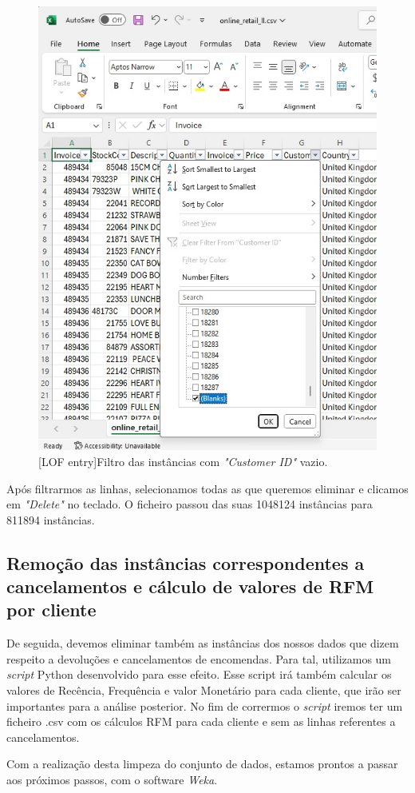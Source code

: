 \documentclass{easychair}
\begin{document}
\begin{figure}[H]
    \begin{centering}
    \includegraphics[width=0.55\linewidth]{imagens/figure1.jpg}\label{cap-2-fig1}
    [LOF entry]{Filtro das instâncias com \textit{"Customer ID"} vazio.}
    \label{fig1}
    \end{centering}
\end{figure}

Após filtrarmos as linhas, selecionamos todas as que queremos eliminar e clicamos em \textit{"Delete"} no teclado. O ficheiro passou das suas 1048124 instâncias para 811894 instâncias.

\newpage

\subsection{Remoção das instâncias correspondentes a cancelamentos e cálculo de valores de RFM por cliente}

De seguida, devemos eliminar também as instâncias dos nossos dados que dizem respeito a devoluções e cancelamentos de encomendas.  Para tal, utilizamos um \textit{script} Python desenvolvido para esse efeito\cite{pythonRFM}. Esse script irá também calcular os valores de Recência, Frequência e valor Monetário para cada cliente, que irão ser importantes para a análise posterior.
No fim de corrermos o \textit{script} iremos ter um ficheiro .csv com os cálculos RFM para cada cliente e sem as linhas referentes a cancelamentos.

Com a realização desta limpeza do conjunto de dados, estamos prontos a passar aos próximos passos, com o software \textit{Weka}\cite{weka}.
\end{document}
